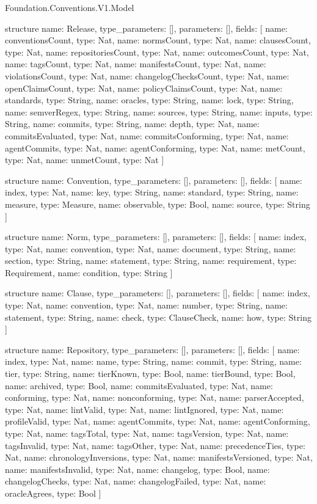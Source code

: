 \begin{lexlean}{Foundation.Conventions.V1.Model}
\begin{semanticmodule}
structure{
  name: Release,
  type_parameters: [],
  parameters: [],
  fields: [
    {name: conventionsCount, type: Nat},
    {name: normsCount, type: Nat},
    {name: clausesCount, type: Nat},
    {name: repositoriesCount, type: Nat},
    {name: outcomesCount, type: Nat},
    {name: tagsCount, type: Nat},
    {name: manifestsCount, type: Nat},
    {name: violationsCount, type: Nat},
    {name: changelogChecksCount, type: Nat},
    {name: openClaimsCount, type: Nat},
    {name: policyClaimsCount, type: Nat},
    {name: standards, type: String},
    {name: oracles, type: String},
    {name: lock, type: String},
    {name: semverRegex, type: String},
    {name: sources, type: String},
    {name: inputs, type: String},
    {name: commits, type: String},
    {name: depth, type: Nat},
    {name: commitsEvaluated, type: Nat},
    {name: commitsConforming, type: Nat},
    {name: agentCommits, type: Nat},
    {name: agentConforming, type: Nat},
    {name: metCount, type: Nat},
    {name: unmetCount, type: Nat}
  ]
}

structure{
  name: Convention,
  type_parameters: [],
  parameters: [],
  fields: [
    {name: index, type: Nat},
    {name: key, type: String},
    {name: standard, type: String},
    {name: measure, type: Measure},
    {name: observable, type: Bool},
    {name: source, type: String}
  ]
}

structure{
  name: Norm,
  type_parameters: [],
  parameters: [],
  fields: [
    {name: index, type: Nat},
    {name: convention, type: Nat},
    {name: document, type: String},
    {name: section, type: String},
    {name: statement, type: String},
    {name: requirement, type: Requirement},
    {name: condition, type: String}
  ]
}

structure{
  name: Clause,
  type_parameters: [],
  parameters: [],
  fields: [
    {name: index, type: Nat},
    {name: convention, type: Nat},
    {name: number, type: String},
    {name: statement, type: String},
    {name: check, type: ClauseCheck},
    {name: how, type: String}
  ]
}

structure{
  name: Repository,
  type_parameters: [],
  parameters: [],
  fields: [
    {name: index, type: Nat},
    {name: name, type: String},
    {name: commit, type: String},
    {name: tier, type: String},
    {name: tierKnown, type: Bool},
    {name: tierBound, type: Bool},
    {name: archived, type: Bool},
    {name: commitsEvaluated, type: Nat},
    {name: conforming, type: Nat},
    {name: nonconforming, type: Nat},
    {name: parserAccepted, type: Nat},
    {name: lintValid, type: Nat},
    {name: lintIgnored, type: Nat},
    {name: profileValid, type: Nat},
    {name: agentCommits, type: Nat},
    {name: agentConforming, type: Nat},
    {name: tagsTotal, type: Nat},
    {name: tagsVersion, type: Nat},
    {name: tagsInvalid, type: Nat},
    {name: tagsOther, type: Nat},
    {name: precedenceTies, type: Nat},
    {name: chronologyInversions, type: Nat},
    {name: manifestsVersioned, type: Nat},
    {name: manifestsInvalid, type: Nat},
    {name: changelog, type: Bool},
    {name: changelogChecks, type: Nat},
    {name: changelogFailed, type: Nat},
    {name: oracleAgrees, type: Bool}
  ]
}


\end{semanticmodule}
\end{lexlean}
